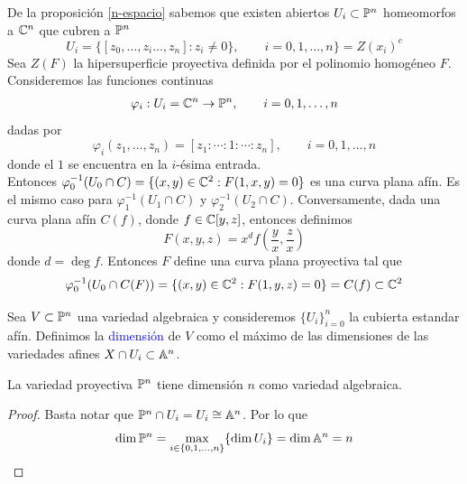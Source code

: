     \begin{remark}
        De la proposición \ref{n-espacio} sabemos que existen abiertos $U_i\subset \mathbb{P}^n $ homeomorfos a $\mathbb{C}^n$ que cubren a $\mathbb{P}^n$
        \begin{equation*}
            U_i=\{[z_0,\dots,z_i\dots,z_n]:z_i\neq 0\},\qquad i=0,1,\dots, n\}=Z(x_i)^{c}
        \end{equation*}
        Sea $Z(F)$ la hipersuperficie proyectiva definida por el polinomio homogéneo $F$. Consideremos las funciones continuas
        \begin{align*}
            \varphi_i: U_i=\mathbb{C}^n\to\mathbb{P}^n,\qquad i=0,1,\dots, n
        \end{align*}
        dadas por
        \begin{equation*}
            \varphi_i(z_1,\dots, z_n)=[z_1:\cdots:1:\cdots:z_n],\qquad i=0,1,\dots, n
        \end{equation*}
        donde el $1$ se encuentra en la $i$-ésima entrada.\\
        Entonces $\varphi_0^{-1}(U_0\cap C)=\{(x,y)\in\mathbb{C}^2: F(1,x,y)=0\}$ es una curva plana afín. Es el mismo caso para $\varphi_1^{-1}(U_1\cap C)$ y $\varphi_2^{-1}(U_2\cap C)$. Conversamente, dada una curva plana afín $C(f)$, donde $f\in\mathbb{C}[y,z]$, entonces definimos
        \begin{equation*}
            F(x,y,z)=x^{d}f\left(\frac{y}{x},\frac{z}{x}\right)
        \end{equation*}
        donde $d=\deg f$. Entonces $F$ define una curva plana proyectiva tal que 
        \begin{equation*}
            \varphi_{0}^{-1}(U_0\cap C(F))=\{(x,y)\in\mathbb{C}^2:F(1,y,z)=0\}=C(f)\subset \mathbb{C}^2
        \end{equation*}

    \end{remark}

    \begin{definition}
        Sea $V\subset \mathbb{P}^n$ una variedad algebraica y consideremos $\{U_i\}_{i=0}^{n}$ la cubierta estandar afín. Definimos la \textcolor{blue}{dimensión} de $V$ como el máximo de las dimensiones de las variedades afines $X\cap U_i\subset \mathbb{A}^n$.
    \end{definition}

    \begin{propo}
        La variedad proyectiva $\mathbb{P}^n$ tiene dimensión $n$ como variedad algebraica.
    \end{propo}
    \begin{proof}
        Basta notar que $\mathbb{P}^n\cap U_i=U_i\cong \mathbb{A}^n$. Por lo que
        \begin{equation*}
            \dim \mathbb{P}^n = \max_{i\in\{0,1,\dots,n\}} \{\dim U_i\} =\dim \mathbb{A} ^n =n
        \end{equation*}
    \end{proof}

